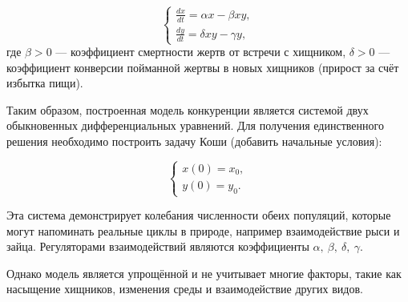 \begin{equation}
	\begin{cases}
		\frac{dx}{dt} = \alpha x - \beta x y,\\
		\frac{dy}{dt} = \delta x y - \gamma y,
	\end{cases}
	\label{eq:model}
\end{equation}
где $\beta > 0$ — коэффициент смертности жертв от встречи с хищником, $\delta > 0$ — коэффициент конверсии пойманной жертвы в новых хищников (прирост за счёт избытка пищи).

Таким образом, построенная модель конкуренции является системой двух обыкновенных дифференциальных уравнений. Для получения единственного решения необходимо построить задачу Коши (добавить начальные условия):

\begin{equation}
	\begin{cases}
		x(0) = x_0,\\
		y(0) = y_0.
	\end{cases}
	\label{eq:terms}
\end{equation}

Эта система демонстрирует колебания численности обеих популяций, которые могут напоминать реальные циклы в природе, например взаимодействие рыси и зайца. Регуляторами взаимодействий являются коэффициенты $\alpha, \ \beta, \ \delta, \ \gamma$. 

Однако модель является упрощённой и не учитывает многие факторы, такие как насыщение хищников, изменения среды и взаимодействие других видов.
